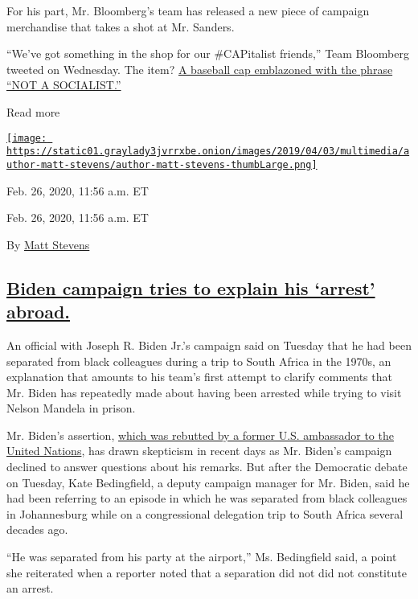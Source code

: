 For his part, Mr. Bloomberg's team has released a new piece of campaign
merchandise that takes a shot at Mr. Sanders.

``We've got something in the shop for our \#CAPitalist friends,'' Team
Bloomberg tweeted on Wednesday. The item?
\href{https://twitter.com/Mike2020/status/1232668650253029378}{A
baseball cap emblazoned with the phrase ``NOT A SOCIALIST.''}

Read more

\href{https://www.nytimes3xbfgragh.onion/by/matt-stevens}{\texttt{[image: https://static01.graylady3jvrrxbe.onion/images/2019/04/03/multimedia/author-matt-stevens/author-matt-stevens-thumbLarge.png]}}

Feb. 26, 2020, 11:56 a.m. ET

Feb. 26, 2020, 11:56 a.m. ET

By \href{https://www.nytimes3xbfgragh.onion/by/matt-stevens}{Matt
Stevens}

\hypertarget{biden-campaign-tries-to-explain-his-arrest-abroad}{%
\subsection{\texorpdfstring{\protect\hyperlink{biden-campaign-tries-to-explain-his-arrest-abroad}{Biden
campaign tries to explain his `arrest'
abroad.}}{Biden campaign tries to explain his `arrest' abroad.}}\label{biden-campaign-tries-to-explain-his-arrest-abroad}}

An official with Joseph R. Biden Jr.'s campaign said on Tuesday that he
had been separated from black colleagues during a trip to South Africa
in the 1970s, an explanation that amounts to his team's first attempt to
clarify comments that Mr. Biden has repeatedly made about having been
arrested while trying to visit Nelson Mandela in prison.

Mr. Biden's assertion,
\href{https://www.nytimes3xbfgragh.onion/2020/02/21/us/politics/biden-south-africa-arrest-mandela.html}{which
was rebutted by a former U.S. ambassador to the United Nations}, has
drawn skepticism in recent days as Mr. Biden's campaign declined to
answer questions about his remarks. But after the Democratic debate on
Tuesday, Kate Bedingfield, a deputy campaign manager for Mr. Biden, said
he had been referring to an episode in which he was separated from black
colleagues in Johannesburg while on a congressional delegation trip to
South Africa several decades ago.

``He was separated from his party at the airport,'' Ms. Bedingfield
said, a point she reiterated when a reporter noted that a separation did
not did not constitute an arrest.

